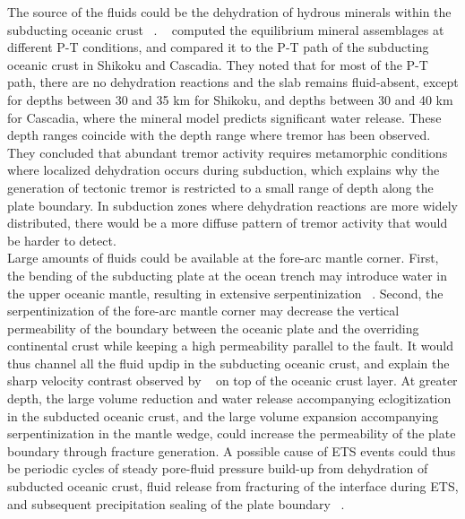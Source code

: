 \documentclass[draft]{agujournal2019}
\begin{document}
The source of the fluids could be the dehydration of hydrous minerals within the subducting oceanic crust ~\cite{SHE_2006}. ~ computed the equilibrium mineral assemblages at different P-T conditions, and compared it to the P-T path of the subducting oceanic crust in Shikoku and Cascadia. They noted that for most of the P-T path, there are no dehydration reactions and the slab remains fluid-absent, except for depths between 30 and 35 km for Shikoku, and depths between 30 and 40 km for Cascadia, where the mineral model predicts significant water release. These depth ranges coincide with the depth range where tremor has been observed. They concluded that abundant tremor activity requires metamorphic conditions where localized dehydration occurs during subduction, which explains why the generation of tectonic tremor is restricted to a small range of depth along the plate boundary. In subduction zones where dehydration reactions are more widely distributed, there would be a more diffuse pattern of tremor activity that would be harder to detect. \\

Large amounts of fluids could be available at the fore-arc mantle corner. First, the bending of the subducting plate at the ocean trench may introduce water in the upper oceanic mantle, resulting in extensive serpentinization ~\cite{HYN_2015}. Second, the serpentinization of the fore-arc mantle corner may decrease the vertical permeability of the boundary between the oceanic plate and the overriding continental crust while keeping a high permeability parallel to the fault. It would thus channel all the fluid updip in the subducting oceanic crust, and explain the sharp velocity contrast observed by ~ on top of the oceanic crust layer. At greater depth, the large volume reduction and water release accompanying eclogitization in the subducted oceanic crust, and the large volume expansion accompanying serpentinization in the mantle wedge, could increase the permeability of the plate boundary through fracture generation. A possible cause of ETS events could thus be periodic cycles of steady pore-fluid pressure build-up from dehydration of subducted oceanic crust, fluid release from fracturing of the interface during ETS, and subsequent precipitation sealing of the plate boundary ~\cite{AUD_2009}. \\
\end{document}
